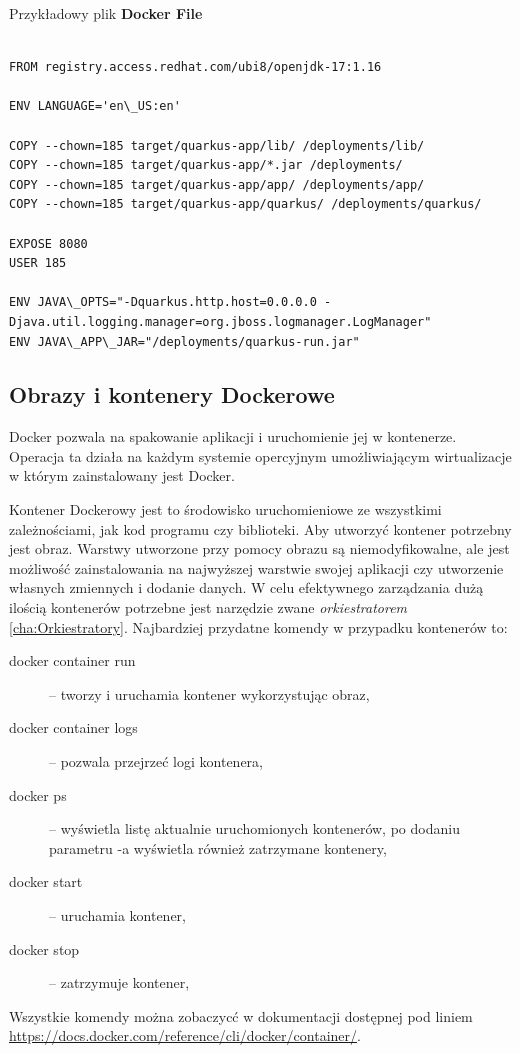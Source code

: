 \documentclass{iiuwb}
\begin{document}
Przykładowy plik \textbf{Docker File}\newline

\begin{lstlisting}[breaklines=true]

FROM registry.access.redhat.com/ubi8/openjdk-17:1.16

ENV LANGUAGE='en\_US:en'

COPY --chown=185 target/quarkus-app/lib/ /deployments/lib/
COPY --chown=185 target/quarkus-app/*.jar /deployments/
COPY --chown=185 target/quarkus-app/app/ /deployments/app/
COPY --chown=185 target/quarkus-app/quarkus/ /deployments/quarkus/

EXPOSE 8080
USER 185

ENV JAVA\_OPTS="-Dquarkus.http.host=0.0.0.0 -
Djava.util.logging.manager=org.jboss.logmanager.LogManager"
ENV JAVA\_APP\_JAR="/deployments/quarkus-run.jar"

\end{lstlisting}

\subsection{Obrazy i kontenery Dockerowe}
\label{images and containers}

Docker pozwala na spakowanie aplikacji i uruchomienie jej w kontenerze. Operacja ta działa na każdym systemie opercyjnym umożliwiającym wirtualizacje w którym zainstalowany jest Docker.

Kontener Dockerowy jest to środowisko uruchomieniowe ze wszystkimi zależnościami, jak kod programu czy biblioteki. Aby utworzyć kontener potrzebny jest obraz. Warstwy utworzone przy pomocy obrazu są niemodyfikowalne, ale jest możliwość zainstalowania na najwyższej warstwie swojej aplikacji czy utworzenie własnych zmiennych i dodanie danych. W celu efektywnego zarządzania dużą ilością kontenerów potrzebne jest narzędzie zwane \textit{orkiestratorem} \ref{cha:Orkiestratory}. 
\newline
Najbardziej przydatne komendy w przypadku kontenerów to:
\begin{description}
  \item[docker container run] -- tworzy i uruchamia kontener wykorzystując obraz,
  \item[docker container logs] -- pozwala przejrzeć logi kontenera,
  \item[docker ps] -- wyświetla listę aktualnie uruchomionych kontenerów, po dodaniu parametru -a wyświetla również zatrzymane kontenery,
  \item[docker start] -- uruchamia kontener,
  \item[docker stop] -- zatrzymuje kontener,
\end{description}
Wszystkie komendy można zobaczycć w dokumentacji dostępnej pod liniem \newline
\url{https://docs.docker.com/reference/cli/docker/container/}.
\newline
\end{document}
